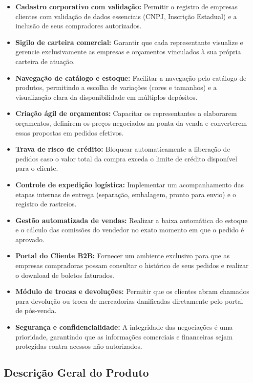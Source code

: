 \documentclass[12pt,a4paper]{article}
\begin{document}
\begin{itemize}
  \item \textbf{Cadastro corporativo com validação:} Permitir o registro de empresas clientes com validação de dados essenciais (CNPJ, Inscrição Estadual) e a inclusão de seus compradores autorizados.
  \item \textbf{Sigilo de carteira comercial:} Garantir que cada representante visualize e gerencie exclusivamente as empresas e orçamentos vinculados à sua própria carteira de atuação.
  \item \textbf{Navegação de catálogo e estoque:} Facilitar a navegação pelo catálogo de produtos, permitindo a escolha de variações (cores e tamanhos) e a visualização clara da disponibilidade em múltiplos depósitos.
  \item \textbf{Criação ágil de orçamentos:} Capacitar os representantes a elaborarem orçamentos, definirem os preços negociados na ponta da venda e converterem essas propostas em pedidos efetivos.
  \item \textbf{Trava de risco de crédito:} Bloquear automaticamente a liberação de pedidos caso o valor total da compra exceda o limite de crédito disponível para o cliente.
  \item \textbf{Controle de expedição logística:} Implementar um acompanhamento das etapas internas de entrega (separação, embalagem, pronto para envio) e o registro de rastreios.
  \item \textbf{Gestão automatizada de vendas:} Realizar a baixa automática do estoque e o cálculo das comissões do vendedor no exato momento em que o pedido é aprovado.
  \item \textbf{Portal do Cliente B2B:} Fornecer um ambiente exclusivo para que as empresas compradoras possam consultar o histórico de seus pedidos e realizar o download de boletos faturados.
  \item \textbf{Módulo de trocas e devoluções:} Permitir que os clientes abram chamados para devolução ou troca de mercadorias danificadas diretamente pelo portal de pós-venda.
  \item \textbf{Segurança e confidencialidade:} A integridade das negociações é uma prioridade, garantindo que as informações comerciais e financeiras sejam protegidas contra acessos não autorizados.
\end{itemize}

\subsection{Descrição Geral do Produto}
\end{document}
